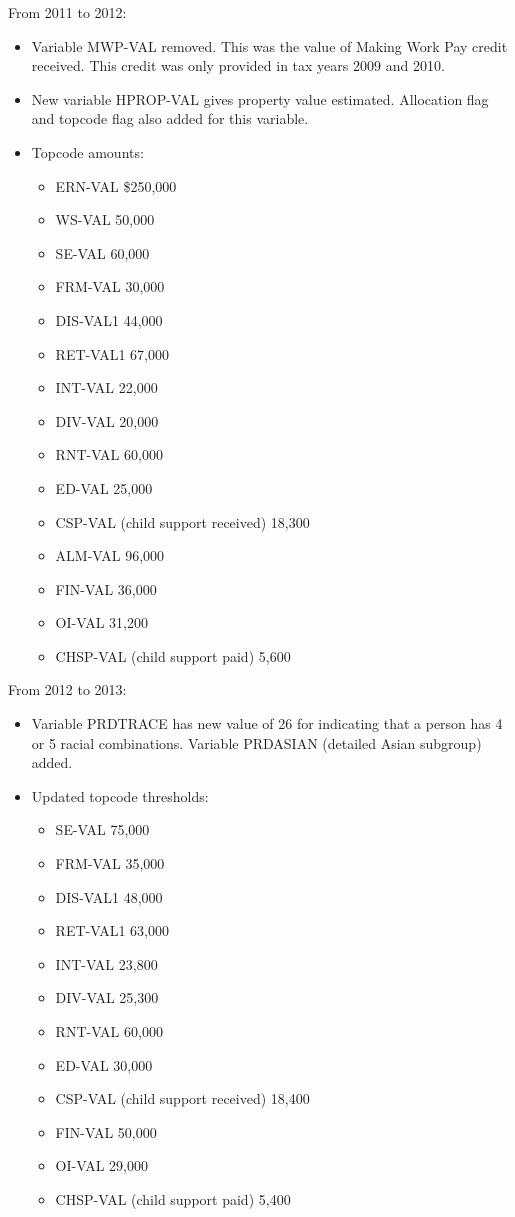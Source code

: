 \documentclass{article}
\begin{document}
From 2011 to 2012:
\begin{itemize}
	\item Variable MWP-VAL removed. This was the value of Making Work Pay credit received. This credit was only provided in tax years 2009 and 2010.
	\item New variable HPROP-VAL gives property value estimated. Allocation flag and topcode flag also added for this variable.
	\item Topcode amounts:
	\begin{itemize}
		\item ERN-VAL \$250,000
		\item WS-VAL 50,000
		\item SE-VAL 60,000
		\item FRM-VAL 30,000
		\item DIS-VAL1 44,000
		\item RET-VAL1 67,000
		\item INT-VAL 22,000
		\item DIV-VAL 20,000
		\item RNT-VAL 60,000
		\item ED-VAL 25,000
		\item CSP-VAL (child support received) 18,300
		\item ALM-VAL 96,000
		\item FIN-VAL 36,000
		\item OI-VAL 31,200
		\item CHSP-VAL (child support paid) 5,600
	\end{itemize}
\end{itemize}

From 2012 to 2013:
\begin{itemize}
	\item Variable PRDTRACE has new value of 26 for indicating that a person has 4 or 5 racial combinations. Variable PRDASIAN (detailed Asian subgroup) added.
	\item Updated topcode thresholds:
	\begin{itemize}
		\item SE-VAL 75,000
		\item FRM-VAL 35,000
		\item DIS-VAL1 48,000
		\item RET-VAL1 63,000
		\item INT-VAL 23,800
		\item DIV-VAL 25,300
		\item RNT-VAL 60,000
		\item ED-VAL 30,000
		\item CSP-VAL (child support received) 18,400
		\item FIN-VAL 50,000
		\item OI-VAL 29,000
		\item CHSP-VAL (child support paid) 5,400
	\end{itemize}
\end{itemize}
\end{document}
